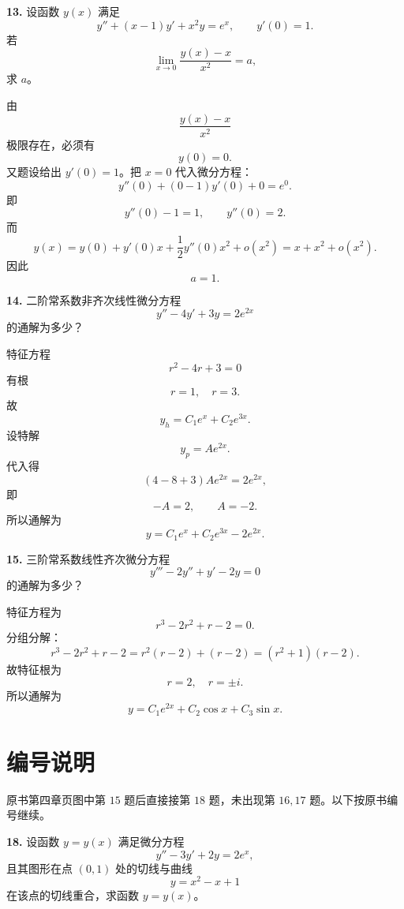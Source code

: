 \begin{problemblock}
\textbf{13.} 设函数 \(y(x)\) 满足
\[
y''+(x-1)y'+x^2y=e^x,\qquad y'(0)=1.
\]
若
\[
\lim_{x\to0}\frac{y(x)-x}{x^2}=a,
\]
求 \(a\)。
\end{problemblock}

\begin{solutionblock}
由
\[
\frac{y(x)-x}{x^2}
\]
极限存在，必须有
\[
y(0)=0.
\]
又题设给出 \(y'(0)=1\)。把 \(x=0\) 代入微分方程：
\[
y''(0)+(0-1)y'(0)+0=e^0.
\]
即
\[
y''(0)-1=1,
\qquad y''(0)=2.
\]
而
\[
y(x)=y(0)+y'(0)x+\frac12y''(0)x^2+o(x^2)
=x+x^2+o(x^2).
\]
因此
\[
a=\boxed{1}.
\]
\end{solutionblock}

\begin{problemblock}
\textbf{14.} 二阶常系数非齐次线性微分方程
\[
y''-4y'+3y=2e^{2x}
\]
的通解为多少？
\end{problemblock}

\begin{solutionblock}
特征方程
\[
r^2-4r+3=0
\]
有根
\[
r=1,\quad r=3.
\]
故
\[
y_h=C_1e^x+C_2e^{3x}.
\]
设特解
\[
y_p=Ae^{2x}.
\]
代入得
\[
(4-8+3)Ae^{2x}=2e^{2x},
\]
即
\[
-A=2,\qquad A=-2.
\]
所以通解为
\[
\boxed{y=C_1e^x+C_2e^{3x}-2e^{2x}}.
\]
\end{solutionblock}

\begin{problemblock}
\textbf{15.} 三阶常系数线性齐次微分方程
\[
y'''-2y''+y'-2y=0
\]
的通解为多少？
\end{problemblock}

\begin{solutionblock}
特征方程为
\[
r^3-2r^2+r-2=0.
\]
分组分解：
\[
r^3-2r^2+r-2
=r^2(r-2)+(r-2)
=(r^2+1)(r-2).
\]
故特征根为
\[
r=2,\quad r=\pm i.
\]
所以通解为
\[
\boxed{y=C_1e^{2x}+C_2\cos x+C_3\sin x}.
\]
\end{solutionblock}

\section{编号说明}
原书第四章页图中第 \(15\) 题后直接接第 \(18\) 题，未出现第 \(16,17\) 题。以下按原书编号继续。

\begin{problemblock}
\textbf{18.} 设函数 \(y=y(x)\) 满足微分方程
\[
y''-3y'+2y=2e^x,
\]
且其图形在点 \((0,1)\) 处的切线与曲线
\[
y=x^2-x+1
\]
在该点的切线重合，求函数 \(y=y(x)\)。
\end{problemblock}

